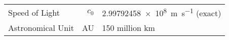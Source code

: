 \begin{constants}
    \begin{longtable}{lr@{${}={}$}l}

     Speed of Light & \(c_{0}\) & \SI{2.99792458e8}{\meter\per\second} (exact)\\
     Astronomical Unit & AU & 150 million km\\
\end{longtable}
\end{constants}
